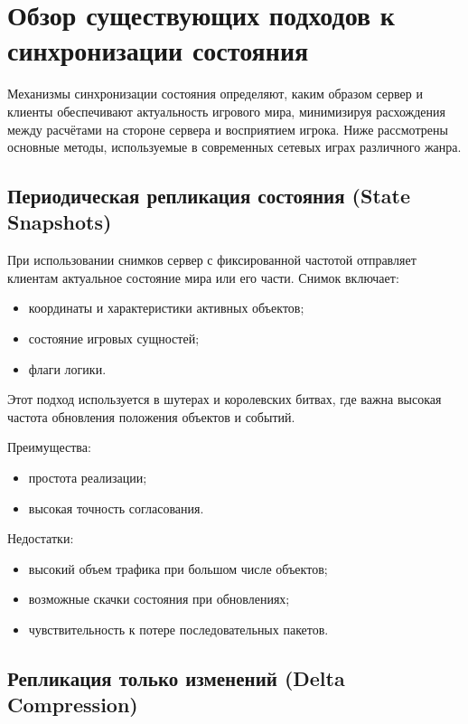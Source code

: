 \chapter{Обзор существующих подходов к синхронизации состояния}

Механизмы синхронизации состояния определяют, каким образом сервер и клиенты обеспечивают
актуальность игрового мира, минимизируя расхождения между расчётами на стороне сервера и
восприятием игрока. Ниже рассмотрены основные методы,
используемые в современных сетевых играх различного жанра.

\section{Периодическая репликация состояния (State Snapshots)}

При использовании снимков сервер с фиксированной частотой отправляет клиентам актуальное состояние
мира или его части\cite{valvesource}. Снимок включает:

\begin{itemize}
    \item координаты и характеристики активных объектов;
    \item состояние игровых сущностей;
    \item флаги логики.
\end{itemize}

Этот подход используется в шутерах и королевских битвах\cite{unity_netcode_docs}, где важна высокая частота обновления положения объектов и событий.


Преимущества:

\begin{itemize}
    \item простота реализации;
    \item высокая точность согласования.
\end{itemize}

Недостатки:

\begin{itemize}
    \item высокий объем трафика при большом числе объектов;
    \item возможные скачки состояния при обновлениях;
    \item чувствительность к потере последовательных пакетов.
\end{itemize}

\section{Репликация только изменений (Delta Compression)}

